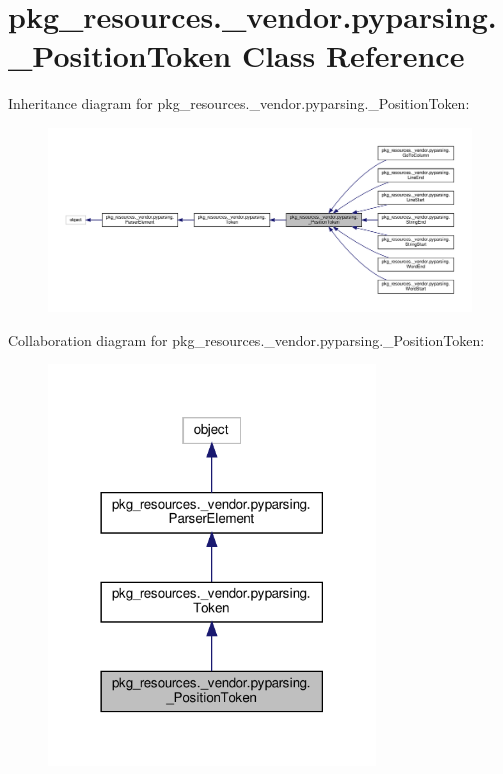 \hypertarget{classpkg__resources_1_1__vendor_1_1pyparsing_1_1__PositionToken}{}\section{pkg\+\_\+resources.\+\_\+vendor.\+pyparsing.\+\_\+\+Position\+Token Class Reference}
\label{classpkg__resources_1_1__vendor_1_1pyparsing_1_1__PositionToken}


Inheritance diagram for pkg\+\_\+resources.\+\_\+vendor.\+pyparsing.\+\_\+\+Position\+Token\+:
\nopagebreak
\begin{figure}[H]
\begin{center}
\leavevmode
\includegraphics[width=350pt]{classpkg__resources_1_1__vendor_1_1pyparsing_1_1__PositionToken__inherit__graph}
\end{center}
\end{figure}


Collaboration diagram for pkg\+\_\+resources.\+\_\+vendor.\+pyparsing.\+\_\+\+Position\+Token\+:
\nopagebreak
\begin{figure}[H]
\begin{center}
\leavevmode
\includegraphics[width=246pt]{classpkg__resources_1_1__vendor_1_1pyparsing_1_1__PositionToken__coll__graph}
\end{center}
\end{figure}

